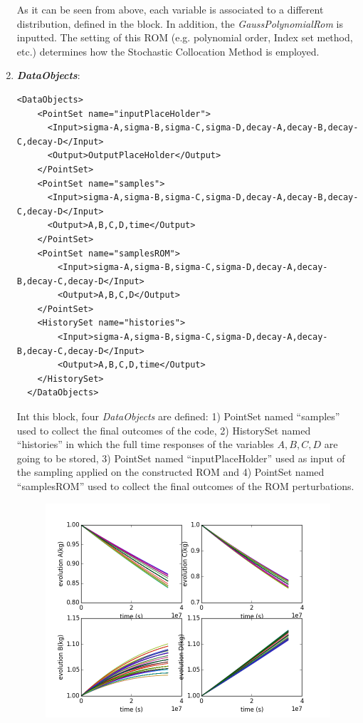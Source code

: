 \begin{enumerate}
  As it can be
  seen from above, each variable is associated to a different distribution,
  defined in the   block.
  In addition, the \textit{GaussPolynomialRom}   is inputted. The setting of this ROM (e.g. polynomial order, Index set method, etc.) determines how the Stochastic Collocation Method is 
  employed.
   \item \textbf{\textit{DataObjects}}:
\begin{lstlisting}[style=XML,morekeywords={arg,extension,pauseAtEnd,overwrite}]
  <DataObjects>
    <PointSet name="inputPlaceHolder">
      <Input>sigma-A,sigma-B,sigma-C,sigma-D,decay-A,decay-B,decay-C,decay-D</Input>
      <Output>OutputPlaceHolder</Output>
    </PointSet>
    <PointSet name="samples">
      <Input>sigma-A,sigma-B,sigma-C,sigma-D,decay-A,decay-B,decay-C,decay-D</Input>
      <Output>A,B,C,D,time</Output>
    </PointSet>
    <PointSet name="samplesROM">
        <Input>sigma-A,sigma-B,sigma-C,sigma-D,decay-A,decay-B,decay-C,decay-D</Input>
        <Output>A,B,C,D</Output>
    </PointSet>
    <HistorySet name="histories">
        <Input>sigma-A,sigma-B,sigma-C,sigma-D,decay-A,decay-B,decay-C,decay-D</Input>
        <Output>A,B,C,D,time</Output>
    </HistorySet>
  </DataObjects>
\end{lstlisting}
  Int this block, four \textit{DataObjects} are defined: 1) PointSet named 
  ``samples'' used to collect the final outcomes of the code, 2) HistorySet named ``histories'' in which the full time responses of the variables $A,B,C,D$ are going to be stored, 3) PointSet named    
  ``inputPlaceHolder'' used as input of the sampling applied on the constructed ROM and 4) PointSet named ``samplesROM'' used to collect the final outcomes of the ROM perturbations.
 \begin{figure}[h!]
  \centering
  \includegraphics[scale=0.7]{pics/histories_SparseGrid.png}

\end{figure}
\end{enumerate}
